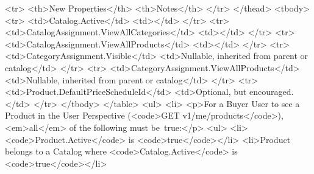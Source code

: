 \documentclass{memoir}%
\begin{document}
<tr>\newline%
<th>New Properties</th>\newline%
<th>Notes</th>\newline%
</tr>\newline%
</thead>\newline%
<tbody>\newline%
<tr>\newline%
<td>Catalog.Active</td>\newline%
<td></td>\newline%
</tr>\newline%
<tr>\newline%
<td>CatalogAssignment.ViewAllCategories</td>\newline%
<td></td>\newline%
</tr>\newline%
<tr>\newline%
<td>CatalogAssignment.ViewAllProducts</td>\newline%
<td></td>\newline%
</tr>\newline%
<tr>\newline%
<td>CategoryAssignment.Visible</td>\newline%
<td>Nullable, inherited from parent or catalog</td>\newline%
</tr>\newline%
<tr>\newline%
<td>CategoryAssignment.ViewAllProducts</td>\newline%
<td>Nullable, inherited from parent or catalog</td>\newline%
</tr>\newline%
<tr>\newline%
<td>Product.DefaultPriceScheduleId</td>\newline%
<td>Optional, but encouraged.</td>\newline%
</tr>\newline%
</tbody>\newline%
</table>\newline%
<ul>\newline%
<li>\newline%
<p>For a Buyer User to see a Product in the User Perspective (<code>GET v1/me/products</code>), <em>all</em> of the following must be~true:</p>\newline%
<ul>\newline%
<li><code>Product.Active</code> is <code>true</code></li>\newline%
<li>Product belongs to a Catalog where <code>Catalog.Active</code> is <code>true</code></li>\newline%
\end{document}
